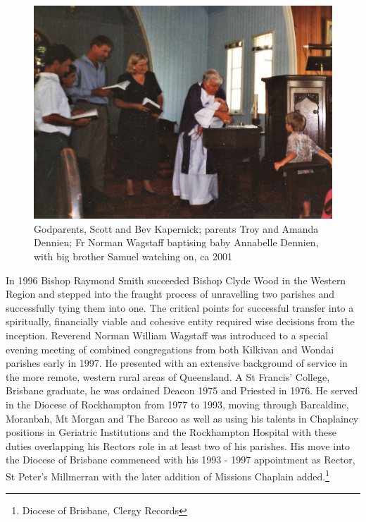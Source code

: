 \begin{figure}[!htb]
\begin{center}
\includegraphics[width=1.\textwidth,center]{../images/baptism2001.jpg}
\caption{Godparents, Scott and Bev Kapernick; parents Troy and Amanda Dennien; Fr Norman Wagstaff baptising baby Annabelle Dennien, with big brother Samuel watching on, ca 2001}
\end{center}
\end{figure}




In 1996 Bishop Raymond Smith succeeded Bishop Clyde Wood in the Western Region and stepped into the fraught process of unravelling two parishes and successfully tying them into one. The critical points for successful transfer into a spiritually, financially viable and cohesive entity required wise decisions from the inception. Reverend Norman William Wagstaff was introduced to a special evening meeting of combined congregations from both Kilkivan and Wondai parishes early in 1997. He presented with an extensive background of service in the more remote, western rural areas of Queensland. A St Francis' College, Brisbane graduate, he was ordained Deacon 1975 and Priested in 1976. He served in the Diocese of Rockhampton from 1977 to 1993, moving through Barcaldine, Moranbah, Mt Morgan and The Barcoo as well as using his talents in Chaplaincy positions in Geriatric Institutions and the Rockhampton Hospital with these duties overlapping his Rectors role in at least two of his parishes. His move into the Diocese of Brisbane commenced with his 1993 - 1997 appointment as Rector, St Peter's Millmerran with the later addition of Missions Chaplain added.\footnote{Diocese of Brisbane, Clergy Records}



